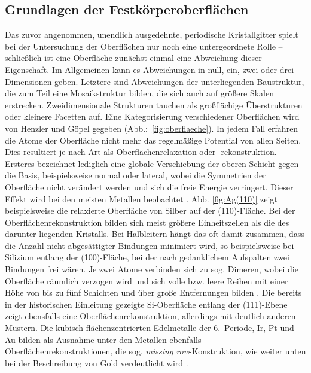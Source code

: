 \subsection{Grundlagen der Festkörperoberflächen}
Das zuvor angenommen, unendlich ausgedehnte, periodische Kristallgitter spielt 
bei der Untersuchung der Oberflächen nur noch eine untergeordnete Rolle – 
schließlich ist eine Oberfläche zunächst einmal eine Abweichung dieser 
Eigenschaft. Im Allgemeinen kann es Abweichungen in null, ein, zwei oder drei 
Dimensionen geben. Letztere sind Abweichungen der unterliegenden Baustruktur, 
die zum Teil eine Mosaikstruktur bilden, die sich auch auf größere Skalen 
erstrecken. Zweidimensionale Strukturen tauchen als großflächige 
Überstrukturen oder kleinere Facetten auf. Eine Kategorisierung verschiedener 
Oberflächen wird von Henzler und Göpel \cite{henzler1991oberflachenphysik} 
gegeben (Abb.:~\ref{fig:oberflaeche}).
In jedem Fall erfahren die Atome der Oberfläche nicht mehr das 
regelmäßige Potential von allen Seiten. Dies resultiert je 
nach Art als Oberflächenrelaxation oder -rekonstruktion. 
Ersteres bezeichnet lediglich eine globale Verschiebung der oberen Schicht 
gegen die Basis, beispielsweise normal oder lateral, wobei die Symmetrien 
der Oberfläche nicht verändert werden und sich die freie Energie verringert. 
Dieser Effekt wird bei den meisten Metallen beobachtet \cite{oura2003surface}. 
Abb. \ref{fig:Ag(110)} zeigt beispielsweise die relaxierte Oberfläche von Silber 
auf der (110)-Fläche.
Bei der Oberflächenrekonstruktion bilden sich meist größere Einheitszellen als die 
des darunter liegenden Kristalls. Bei Halbleitern hängt das oft damit zusammen, 
dass die Anzahl nicht abgesättigter Bindungen minimiert wird, so beispielsweise 
bei Silizium entlang der (100)-Fläche, bei der nach gedanklichem Aufspalten zwei 
Bindungen frei wären. Je zwei Atome verbinden sich zu sog. Dimeren, wobei die 
Oberfläche räumlich verzogen wird und sich volle bzw. leere Reihen mit einer 
Höhe von bis zu fünf Schichten und über große Entfernungen bilden 
\cite{chadi1979atomic}. Die bereits in der historischen Einleitung gezeigte 
Si-Oberfläche entlang der 
(111)-Ebene zeigt ebensfalls eine Oberflächenrekonstruktion, allerdings mit 
deutlich anderen Mustern. Die kubisch-flächenzentrierten Edelmetalle der 
6.~Periode, Ir, Pt und Au bilden als Ausnahme unter den Metallen ebenfalls 
Oberflächenrekonstruktionen, die sog. \emph{missing row}-Konstruktion, 
wie weiter unten bei der Beschreibung von Gold verdeutlicht wird 
\cite{kittel2013einfuhrung}. 

